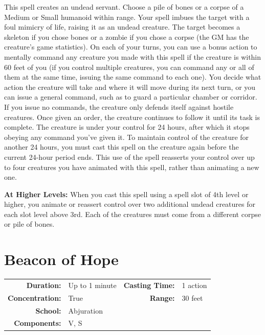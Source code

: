 \documentclass[12pt,showtrims]{memoir}
\begin{document}
\vspace{1\baselineskip}\noindent This spell creates an undead servant. Choose a pile of bones or a corpse of a Medium or Small humanoid within range. Your spell imbues the target with a foul mimicry of life, raising it as an undead creature. The target becomes a skeleton if you chose bones or a zombie if you chose a corpse (the GM has the creature's game statistics). On each of your turns, you can use a bonus action to mentally command any creature you made with this spell if the creature is within 60 feet of you (if you control multiple creatures, you can command any or all of them at the same time, issuing the same command to each one). You decide what action the creature will take and where it will move during its next turn, or you can issue a general command, such as to guard a particular chamber or corridor. If you issue no commands, the creature only defends itself against hostile creatures. Once given an order, the creature continues to follow it until its task is complete. The creature is under your control for 24 hours, after which it stops obeying any command you've given it. To maintain control of the creature for another 24 hours, you must cast this spell on the creature again before the current 24-hour period ends. This use of the spell reasserts your control over up to four creatures you have animated with this spell, rather than animating a new one.

\vspace{8pt} \noindent\textbf{At Higher Levels:} When you cast this spell using a spell slot of 4th level or higher, you animate or reassert control over two additional undead creatures for each slot level above 3rd. Each of the creatures must come from a different corpse or pile of bones.
\newpage
\section*{Beacon of Hope}

{
\small\centering\vspace{-6pt}
\begin{tabular}{rlrl}
\toprule

\textbf{Duration:} & Up to 1 minute &
\textbf{Casting Time:} & 1 action \\
\textbf{Concentration:} & True &
\textbf{Range:} & 30 feet \\
\textbf{School:} & Abjuration \\
\textbf{Components:} & \multicolumn{3}{p{0.7\textwidth}}{V, S}\\

\bottomrule
\end{tabular}
}
\end{document}

